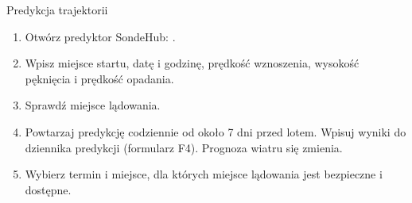 \begin{sekcja}{Predykcja trajektorii}
\begin{enumerate}
  \item Otwórz predyktor SondeHub: .
  \item Wpisz miejsce startu, datę i godzinę, prędkość wznoszenia, wysokość pęknięcia i prędkość opadania.
  \item Sprawdź miejsce lądowania.
  \item Powtarzaj predykcję codziennie od około 7 dni przed lotem. Wpisuj wyniki do dziennika predykcji (formularz F4). Prognoza wiatru się zmienia.
  \item Wybierz termin i miejsce, dla których miejsce lądowania jest bezpieczne i dostępne.
\end{enumerate}
\end{sekcja}

